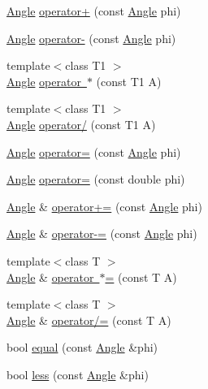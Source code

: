 \begin{DoxyCompactItemize}
\mbox{\hyperlink{class_angle}{Angle}} \mbox{\hyperlink{class_angle_aa04bc36c641e1ecfb7aee5019ed8e6ea}{operator+}} (const \mbox{\hyperlink{class_angle}{Angle}} phi)
\item 
\mbox{\hyperlink{class_angle}{Angle}} \mbox{\hyperlink{class_angle_a951436019a4c06895ba31a08bf0d6fd2}{operator-\/}} (const \mbox{\hyperlink{class_angle}{Angle}} phi)
\item 
{\footnotesize template$<$class T1 $>$ }\\\mbox{\hyperlink{class_angle}{Angle}} \mbox{\hyperlink{class_angle_ab50d514ec9f24c0b65d37f174cbff780}{operator $\ast$}} (const T1 A)
\item 
{\footnotesize template$<$class T1 $>$ }\\\mbox{\hyperlink{class_angle}{Angle}} \mbox{\hyperlink{class_angle_ac72a246e3e3fd5f1c58d2fd89338b1ff}{operator/}} (const T1 A)
\item 
\mbox{\hyperlink{class_angle}{Angle}} \mbox{\hyperlink{class_angle_a93da39f08e2e110e278bb94d1c279ac6}{operator=}} (const \mbox{\hyperlink{class_angle}{Angle}} phi)
\item 
\mbox{\hyperlink{class_angle}{Angle}} \mbox{\hyperlink{class_angle_adf9e68cdeac72b3754bd7d0993a37220}{operator=}} (const double phi)
\item 
\mbox{\hyperlink{class_angle}{Angle}} \& \mbox{\hyperlink{class_angle_a8129646ed5390b538ccf7c19f9213967}{operator+=}} (const \mbox{\hyperlink{class_angle}{Angle}} phi)
\item 
\mbox{\hyperlink{class_angle}{Angle}} \& \mbox{\hyperlink{class_angle_a54a5489837c16a15320f9249d2cabed6}{operator-\/=}} (const \mbox{\hyperlink{class_angle}{Angle}} phi)
\item 
{\footnotesize template$<$class T $>$ }\\\mbox{\hyperlink{class_angle}{Angle}} \& \mbox{\hyperlink{class_angle_aabfd043635f8295cbd08cf50d4388a88}{operator $\ast$=}} (const T A)
\item 
{\footnotesize template$<$class T $>$ }\\\mbox{\hyperlink{class_angle}{Angle}} \& \mbox{\hyperlink{class_angle_ac0421d376bd1c7396088ff465589c4b9}{operator/=}} (const T A)
\item 
bool \mbox{\hyperlink{class_angle_a21d2e7c68957afdd5c7edf3efd3e0bdc}{equal}} (const \mbox{\hyperlink{class_angle}{Angle}} \&phi)
\item 
bool \mbox{\hyperlink{class_angle_a4e25c0ed5a92eb8af995a038c70f4e26}{less}} (const \mbox{\hyperlink{class_angle}{Angle}} \&phi)
\item 

\end{DoxyCompactItemize}

